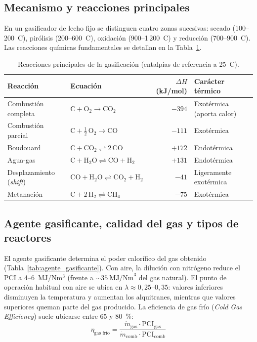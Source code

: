 \subsection{Mecanismo y reacciones principales}
En un gasificador de lecho fijo se distinguen cuatro zonas sucesivas: secado (100--200~\textdegree C), pirólisis (200--600~\textdegree C), oxidación (900--1\,200~\textdegree C) y reducción (700--900~\textdegree C). Las reacciones químicas fundamentales se detallan en la Tabla~\ref{tab:reacciones_gasificacion}.

\begin{table}[htbp]
\centering
\caption{Reacciones principales de la gasificación (entalpías de referencia a 25~\textdegree C).}
\label{tab:reacciones_gasificacion}
\begin{tabular}{@{}llrl@{}}
\toprule
\textbf{Reacción} & \textbf{Ecuación} & \textbf{$\Delta H$ (kJ/mol)} & \textbf{Carácter térmico} \\
\midrule
Combustión completa & $\mathrm{C} + \mathrm{O_2} \longrightarrow \mathrm{CO_2}$ & $-394$ & Exotérmica (aporta calor) \\
Combustión parcial & $\mathrm{C} + \frac{1}{2}\,\mathrm{O_2} \longrightarrow \mathrm{CO}$ & $-111$ & Exotérmica \\
Boudouard & $\mathrm{C} + \mathrm{CO_2} \rightleftharpoons 2\,\mathrm{CO}$ & $+172$ & Endotérmica \\
Agua-gas & $\mathrm{C} + \mathrm{H_2O} \rightleftharpoons \mathrm{CO} + \mathrm{H_2}$ & $+131$ & Endotérmica \\
Desplazamiento (\textit{shift}) & $\mathrm{CO} + \mathrm{H_2O} \rightleftharpoons \mathrm{CO_2} + \mathrm{H_2}$ & $-41$ & Ligeramente exotérmica \\
Metanación & $\mathrm{C} + 2\,\mathrm{H_2} \rightleftharpoons \mathrm{CH_4}$ & $-75$ & Exotérmica \\
\bottomrule
\end{tabular}
\end{table}

\subsection{Agente gasificante, calidad del gas y tipos de reactores}
El agente gasificante determina el poder calorífico del gas obtenido (Tabla~\ref{tab:agente_gasificante}). Con aire, la dilución con nitrógeno reduce el PCI a 4--6~MJ/Nm$^3$ (frente a $\sim 35~\text{MJ/Nm}^3$ del gas natural). El punto de operación habitual con aire se ubica en $\lambda \approx 0{,}25\text{--}0{,}35$: valores inferiores disminuyen la temperatura y aumentan los alquitranes, mientras que valores superiores queman parte del gas producido. La eficiencia de gas frío (\textit{Cold Gas Efficiency}) suele ubicarse entre 65 y 80~\%:
\begin{equation}
\eta_{\text{gas frío}} = \frac{\dot{m}_{\mathrm{gas}} \cdot \mathrm{PCI}_{\mathrm{gas}}}{\dot{m}_{\mathrm{comb}} \cdot \mathrm{PCI}_{\mathrm{comb}}}
\end{equation}

